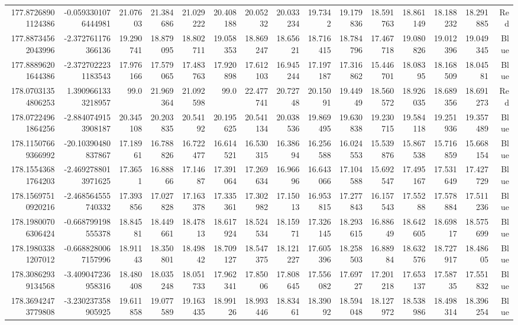 \begin{center}
\begin{longtable}{rrrrrrrrrrrrrrr}
177.87268901124386 & -0.0593301076444981 & 21.07603 & 21.384686 & 21.029222 & 20.408188 & 20.05232 & 20.033234 & 19.7342 & 19.179836 & 18.591763 & 18.861149 & 18.188232 & 18.291885 & Red \\
177.88734562043996 & -2.372761176366136 & 19.290741 & 18.879095 & 18.802711 & 19.058353 & 18.869247 & 18.65621 & 18.716415 & 18.784796 & 17.467718 & 19.080826 & 19.012396 & 19.049345 & Blue \\
177.88896201644386 & -2.3727022231183543 & 17.976166 & 17.579065 & 17.483763 & 17.920898 & 17.612103 & 16.945244 & 17.197187 & 17.316862 & 15.446701 & 18.08395 & 18.168509 & 18.04581 & Blue \\
178.07031354806253 & 1.3909661333218957 & 99.0 & 21.969364 & 21.092598 & 99.0 & 22.477741 & 20.72748 & 20.15091 & 19.44949 & 18.560572 & 18.926035 & 18.689356 & 18.691273 & Red \\
178.07224961864256 & -2.8840749153908187 & 20.345108 & 20.203835 & 20.54192 & 20.195625 & 20.541134 & 20.038536 & 19.869495 & 19.630838 & 19.230715 & 19.584118 & 19.251936 & 19.357489 & Blue \\
178.11507669366992 & -20.10390480837867 & 17.18961 & 16.788826 & 16.722477 & 16.614521 & 16.530315 & 16.38694 & 16.256588 & 16.024553 & 15.539876 & 15.867538 & 15.716859 & 15.668154 & Blue \\
178.15543681764203 & -2.4692788013971625 & 17.3651 & 16.88866 & 17.14687 & 17.391064 & 17.269634 & 16.96696 & 16.643066 & 17.104588 & 15.692547 & 17.495167 & 17.531649 & 17.427729 & Blue \\
178.15697510920216 & -2.468564555740332 & 17.393856 & 17.027828 & 17.163378 & 17.335361 & 17.302982 & 17.15013 & 16.953815 & 17.277843 & 16.157543 & 17.55288 & 17.578884 & 17.511236 & Blue \\
178.19800706306424 & -0.668799198555378 & 18.84581 & 18.449661 & 18.47813 & 18.617924 & 18.524534 & 18.15971 & 17.326145 & 18.293615 & 16.88649 & 18.642605 & 18.69817 & 18.575699 & Blue \\
178.19803381207012 & -0.6688280067157996 & 18.91143 & 18.350801 & 18.49842 & 18.709127 & 18.547375 & 18.121227 & 17.605396 & 18.258503 & 16.88984 & 18.632576 & 18.727917 & 18.48605 & Blue \\
178.30862939134568 & -3.409047236958316 & 18.480408 & 18.035248 & 18.051733 & 17.962341 & 17.85006 & 17.808645 & 17.556082 & 17.69727 & 17.201218 & 17.653137 & 17.58735 & 17.551832 & Blue \\
178.36942473779808 & -3.230237358905925 & 19.611858 & 19.077589 & 19.163435 & 18.99126 & 18.993446 & 18.83461 & 18.39092 & 18.594048 & 18.127972 & 18.538986 & 18.498314 & 18.396254 & Blue \\

\end{longtable}
\end{center}
